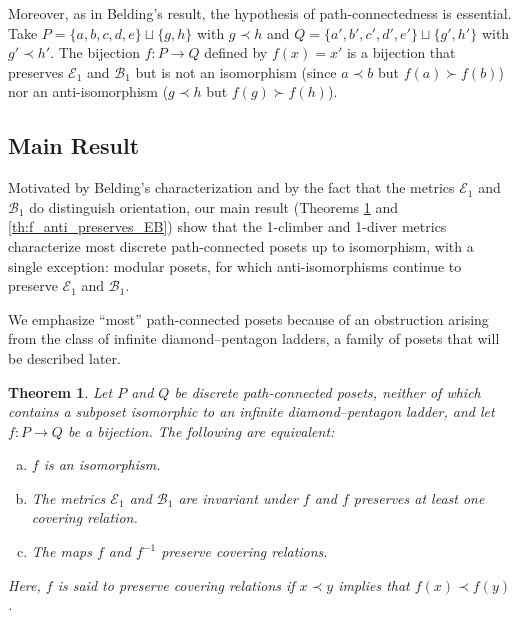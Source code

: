 \documentclass{article}[12pt]
\theoremstyle{exampstyle}
\newtheorem{theorem}{Theorem}[section]
\theoremstyle{remark}
\newcommand{\B}{\mathcal{B}}
\newcommand{\E}{\mathcal{E}}
\begin{document}
Moreover, as in Belding’s result, the hypothesis of path-connectedness is essential. Take $P = \{a,b,c,d,e\} \sqcup \{g,h\}$ with $g \prec h$ and $Q = \{a',b',c',d',e'\} \sqcup \{g',h'\}$ with $g' \prec h'$. The bijection $f: P \to Q$ defined by $f(x) = x'$ is a bijection that preserves  $\E_1$ and $\B_1$ but is not an isomorphism (since $a \prec b$ but $f(a) \succ f(b)$) nor an anti-isomorphism ($g \prec h$ but $f(g) \succ f(h)$).

\subsection{Main Result}

Motivated by Belding’s characterization and by the fact that the metrics $\E_1$ and $\B_1$ do distinguish orientation, our main result (Theorems \ref{th:f_iso_preserves_EB} and \ref{th:f_anti_preserves_EB}) show that the 1-climber and 1-diver metrics characterize most discrete path-connected posets up to isomorphism, with a single exception: modular posets, for which anti-isomorphisms continue to preserve $\E_1$ and $\B_1$. 

We emphasize “most” path-connected posets because of an obstruction arising from the class of infinite diamond–pentagon ladders, a family of posets that will be described later.

\begin{theorem}
    Let $P$ and $Q$ be discrete path-connected posets, neither of which contains a subposet isomorphic to an infinite diamond–pentagon ladder, and let $f: P \to Q$ be a bijection. The following are equivalent:
    \begin{enumerate}[a)]
        \item $f$ is an isomorphism.
        \item The metrics $\E_1$ and $\B_1$ are invariant under $f$ and $f$ preserves at least one covering relation. 
        \item The maps $f$ and $f^{-1}$ preserve covering relations.
    \end{enumerate}

    Here, $f$ is said to preserve covering relations if $x \prec y$ implies that $f(x) \prec f(y)$.
    \label{th:f_iso_preserves_EB}
\end{theorem}
\end{document}
